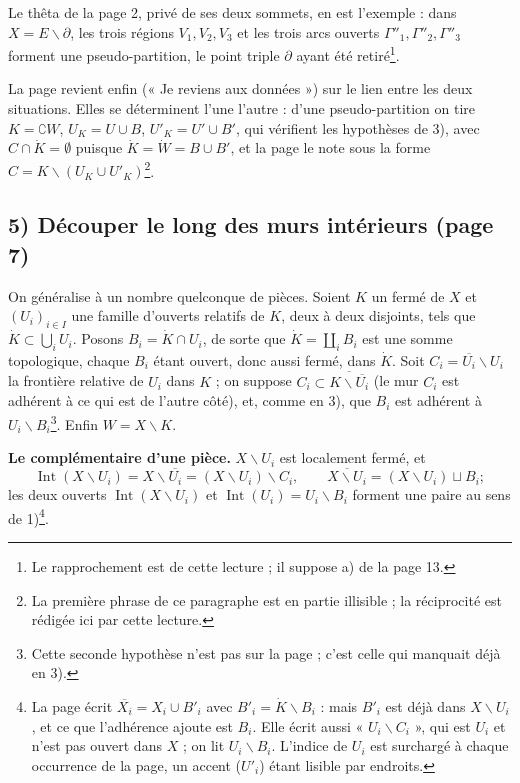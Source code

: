 \documentclass[11pt,a4paper]{article}
\begin{document}
Le thêta de la page 2, privé de ses deux sommets, en est l'exemple : dans $X = E
\smallsetminus \partial$, les trois régions $V_1, V_2, V_3$ et les trois arcs
ouverts $\Gamma''_1, \Gamma''_2, \Gamma''_3$ forment une pseudo-partition, le
point triple $\partial$ ayant été retiré\footnote{Le rapprochement est de
cette lecture ; il suppose a) de la page 13.}.

La page revient enfin (« Je reviens aux données ») sur le lien entre les deux
situations. Elles se déterminent l'une l'autre : d'une pseudo-partition on tire
$K = \complement W$, $U_K = U \cup B$, $U'_K = U' \cup B'$, qui vérifient les
hypothèses de 3), avec $C \cap \dot{K} = \emptyset$ puisque $\dot{K} = \dot{W}
= B \cup B'$, et la page le note sous la forme $C = K \smallsetminus (U_K \cup
U'_K)$\footnote{La première phrase de ce paragraphe est en partie illisible ;
la réciprocité est rédigée ici par cette lecture.}.

\subsection*{5) Découper le long des murs intérieurs (page 7)}

On généralise à un nombre quelconque de pièces. Soient $K$ un fermé de $X$ et
$(U_i)_{i \in I}$ une famille d'ouverts relatifs de $K$, deux à deux disjoints,
tels que $\dot{K} \subset \bigcup_i U_i$. Posons $B_i = \dot{K} \cap U_i$, de
sorte que $\dot{K} = \coprod_i B_i$ est une somme topologique, chaque $B_i$
étant ouvert, donc aussi fermé, dans $\dot{K}$. Soit $C_i = \overline{U_i}
\smallsetminus U_i$ la frontière relative de $U_i$ dans $K$ ; on suppose
$C_i \subset \overline{K \smallsetminus \overline{U_i}}$ (le mur $C_i$ est
adhérent à ce qui est de l'autre côté), et, comme en 3), que $B_i$ est adhérent
à $U_i \smallsetminus B_i$\footnote{Cette seconde hypothèse n'est pas sur la
page ; c'est celle qui manquait déjà en 3).}. Enfin $W = X \smallsetminus K$.

\textbf{Le complémentaire d'une pièce.} $X \smallsetminus U_i$ est localement
fermé, et
\[
\operatorname{Int}(X \smallsetminus U_i) = X \smallsetminus \overline{U_i} = (X
\smallsetminus U_i) \smallsetminus C_i, \qquad \overline{X \smallsetminus U_i}
= (X \smallsetminus U_i) \sqcup B_i ;
\]
les deux ouverts $\operatorname{Int}(X \smallsetminus U_i)$ et
$\operatorname{Int}(U_i) = U_i \smallsetminus B_i$ forment une paire au sens de
1)\footnote{La page écrit $\overline{X_i} = X_i \cup B'_i$ avec $B'_i = \dot{K}
\smallsetminus B_i$ : mais $B'_i$ est déjà dans $X \smallsetminus U_i$, et ce
que l'adhérence ajoute est $B_i$. Elle écrit aussi « $U_i \smallsetminus C_i$ »,
qui est $U_i$ et n'est pas ouvert dans $X$ ; on lit $U_i \smallsetminus B_i$.
L'indice de $U_i$ est surchargé à chaque occurrence de la page, un accent
($U'_i$) étant lisible par endroits.}.
\end{document}
